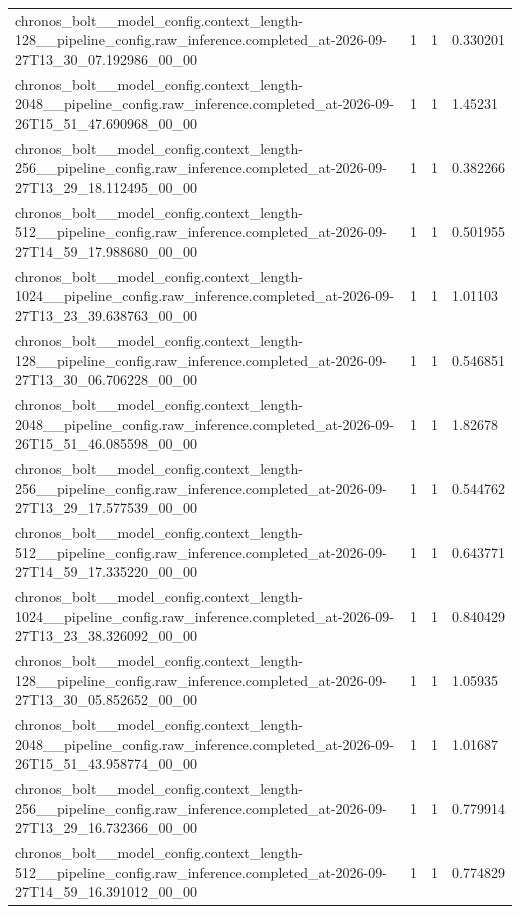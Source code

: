 \begin{tabular}{llll}
chronos\_bolt\_\_model\_config.context\_length-128\_\_pipeline\_config.raw\_inference.completed\_at-2026-09-27T13\_30\_07.192986\_00\_00 & 1 & 1 & 0.330201 \\
chronos\_bolt\_\_model\_config.context\_length-2048\_\_pipeline\_config.raw\_inference.completed\_at-2026-09-26T15\_51\_47.690968\_00\_00 & 1 & 1 & 1.45231 \\
chronos\_bolt\_\_model\_config.context\_length-256\_\_pipeline\_config.raw\_inference.completed\_at-2026-09-27T13\_29\_18.112495\_00\_00 & 1 & 1 & 0.382266 \\
chronos\_bolt\_\_model\_config.context\_length-512\_\_pipeline\_config.raw\_inference.completed\_at-2026-09-27T14\_59\_17.988680\_00\_00 & 1 & 1 & 0.501955 \\
chronos\_bolt\_\_model\_config.context\_length-1024\_\_pipeline\_config.raw\_inference.completed\_at-2026-09-27T13\_23\_39.638763\_00\_00 & 1 & 1 & 1.01103 \\
chronos\_bolt\_\_model\_config.context\_length-128\_\_pipeline\_config.raw\_inference.completed\_at-2026-09-27T13\_30\_06.706228\_00\_00 & 1 & 1 & 0.546851 \\
chronos\_bolt\_\_model\_config.context\_length-2048\_\_pipeline\_config.raw\_inference.completed\_at-2026-09-26T15\_51\_46.085598\_00\_00 & 1 & 1 & 1.82678 \\
chronos\_bolt\_\_model\_config.context\_length-256\_\_pipeline\_config.raw\_inference.completed\_at-2026-09-27T13\_29\_17.577539\_00\_00 & 1 & 1 & 0.544762 \\
chronos\_bolt\_\_model\_config.context\_length-512\_\_pipeline\_config.raw\_inference.completed\_at-2026-09-27T14\_59\_17.335220\_00\_00 & 1 & 1 & 0.643771 \\
chronos\_bolt\_\_model\_config.context\_length-1024\_\_pipeline\_config.raw\_inference.completed\_at-2026-09-27T13\_23\_38.326092\_00\_00 & 1 & 1 & 0.840429 \\
chronos\_bolt\_\_model\_config.context\_length-128\_\_pipeline\_config.raw\_inference.completed\_at-2026-09-27T13\_30\_05.852652\_00\_00 & 1 & 1 & 1.05935 \\
chronos\_bolt\_\_model\_config.context\_length-2048\_\_pipeline\_config.raw\_inference.completed\_at-2026-09-26T15\_51\_43.958774\_00\_00 & 1 & 1 & 1.01687 \\
chronos\_bolt\_\_model\_config.context\_length-256\_\_pipeline\_config.raw\_inference.completed\_at-2026-09-27T13\_29\_16.732366\_00\_00 & 1 & 1 & 0.779914 \\
chronos\_bolt\_\_model\_config.context\_length-512\_\_pipeline\_config.raw\_inference.completed\_at-2026-09-27T14\_59\_16.391012\_00\_00 & 1 & 1 & 0.774829 \\

\end{tabular}
